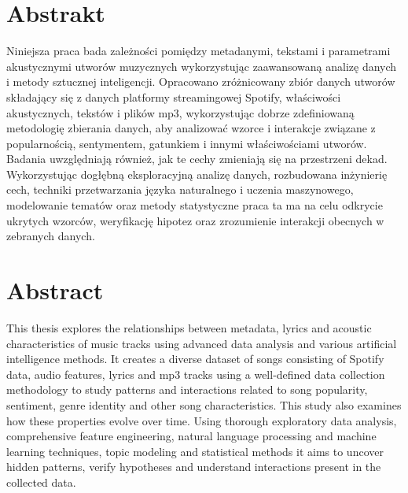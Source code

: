\documentclass[oneside, 12pt]{book}
\begin{document}
\thispagestyle{empty}





\chapter*{Abstrakt}
Niniejsza praca bada zależności pomiędzy metadanymi, tekstami i parametrami
akustycznymi utworów muzycznych wykorzystując zaawansowaną analizę danych i
metody sztucznej inteligencji. Opracowano zróżnicowany zbiór danych utworów
składający się z danych platformy streamingowej Spotify, właściwości
akustycznych, tekstów i plików mp3, wykorzystując dobrze zdefiniowaną
metodologię zbierania danych, aby analizować wzorce i interakcje związane z
popularnością, sentymentem, gatunkiem i innymi właściwościami utworów. Badania
uwzględniają również, jak te cechy zmieniają się na przestrzeni dekad.
Wykorzystując dogłębną eksploracyjną analizę danych, rozbudowana inżynierię
cech, techniki przetwarzania języka naturalnego i uczenia maszynowego,
modelowanie tematów oraz metody statystyczne praca ta ma na celu odkrycie
ukrytych wzorców, weryfikację hipotez oraz zrozumienie interakcji obecnych w
zebranych danych.


\chapter*{Abstract}
This thesis explores the relationships between metadata, lyrics and acoustic
characteristics of music tracks using advanced data analysis and various
artificial intelligence methods. It creates a diverse dataset of songs
consisting of Spotify data, audio features, lyrics and mp3 tracks using a
well-defined data collection methodology to study patterns and interactions
related to song popularity, sentiment, genre identity and other song
characteristics. This study also examines how these properties evolve over
time. Using thorough exploratory data analysis, comprehensive feature
engineering, natural language processing and machine learning techniques, topic
modeling and statistical methods it aims to uncover hidden patterns, verify
hypotheses and understand interactions present in the collected data.
\end{document}
